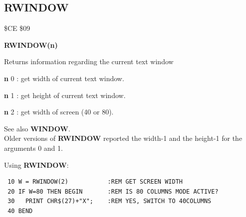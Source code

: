 \subsection{RWINDOW}
\begin{description}[leftmargin=2cm,style=nextline]
\item [Token:] \$CE \$09
\item [Format:] {\bf RWINDOW(n)}
\item [Usage:]  Returns information regarding the current text window

                {\bf n} 0 : get width of current text window.

                {\bf n} 1 : get height of current text window.

                {\bf n} 2 : get width of screen (40 or 80).

\item [Remarks:] See also {\bf WINDOW}. \\
                 Older versions of {\bf RWINDOW} reported
                 the width-1 and the height-1 for the arguments 0 and 1.

\item [Example:] Using {\bf RWINDOW}:
\begin{tcolorbox}[colback=black,coltext=white]
\verbatimfont{\codefont}
\begin{verbatim}
 10 W = RWINDOW(2)           :REM GET SCREEN WIDTH
 20 IF W=80 THEN BEGIN       :REM IS 80 COLUMNS MODE ACTIVE?
 30   PRINT CHR$(27)+"X";    :REM YES, SWITCH TO 40COLUMNS
 40 BEND
\end{verbatim}
\end{tcolorbox}
\end{description}





\newpage
